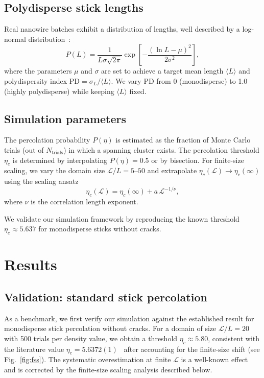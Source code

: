 \subsection{Polydisperse stick lengths}

Real nanowire batches exhibit a distribution of lengths,
well described by a log-normal distribution~\cite{Bergin2012}:
\begin{equation}
  P(L) = \frac{1}{L\sigma\sqrt{2\pi}}
  \exp\!\left[-\frac{(\ln L - \mu)^2}{2\sigma^2}\right],
\end{equation}
where the parameters $\mu$ and $\sigma$ are set to achieve
a target mean length $\langle L \rangle$ and polydispersity
index $\mathrm{PD} = \sigma_L / \langle L \rangle$.
We vary $\mathrm{PD}$ from 0 (monodisperse) to 1.0
(highly polydisperse) while keeping $\langle L \rangle$ fixed.

\subsection{Simulation parameters}

The percolation probability $P(\eta)$ is estimated as the fraction
of Monte Carlo trials (out of $N_\mathrm{trials}$) in which
a spanning cluster exists.
The percolation threshold $\eta_c$ is determined by interpolating
$P(\eta) = 0.5$ or by bisection.
For finite-size scaling, we vary the domain size
$\mathcal{L}/L = 5$--$50$ and extrapolate
$\eta_c(\mathcal{L}) \to \eta_c(\infty)$
using the scaling ansatz
\begin{equation}
  \eta_c(\mathcal{L}) = \eta_c(\infty) + a\,\mathcal{L}^{-1/\nu},
  \label{eq:fss}
\end{equation}
where $\nu$ is the correlation length exponent.

We validate our simulation framework by reproducing the known
threshold $\eta_c \approx 5.637$ for monodisperse sticks
without cracks.

\section{Results}

\subsection{Validation: standard stick percolation}

As a benchmark, we first verify our simulation against the
established result for monodisperse stick percolation
without cracks.
For a domain of size $\mathcal{L}/L = 20$ with
500 trials per density value, we obtain a threshold
$\eta_c \approx 5.80$, consistent
with the literature value $\eta_c = 5.6372(1)$~\cite{Li2009}
after accounting for the finite-size shift
(see Fig.~\ref{fig:fss}).
The systematic overestimation at finite $\mathcal{L}$
is a well-known effect~\cite{Li2009,Tarasevich2018}
and is corrected by the finite-size scaling analysis
described below.

